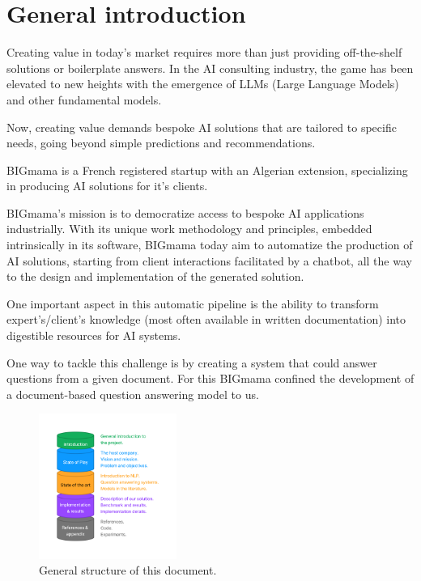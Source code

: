 \documentclass[a4paper,12pt]{article}
\begin{document}
\onecolumn
\tableofcontents
\listoffigures
\listoftables

\newpage
\printglossary[type=\acronymtype, title=List of acronyms]

\newpage

\section{General introduction}
Creating value in today's market requires more than just providing off-the-shelf solutions or boilerplate answers. 
In the AI consulting industry, the game has been elevated to new heights with the emergence of LLMs (Large Language Models) and other fundamental models. 

Now, creating value demands bespoke AI solutions that are tailored to specific needs, 
going beyond simple predictions and recommendations.

BIGmama is a French registered startup with an Algerian extension, 
specializing in producing AI solutions for it's clients.

BIGmama's mission is to democratize access to bespoke AI applications industrially. 
With its unique work methodology and principles, embedded intrinsically in its software, BIGmama today aim
to automatize the production of AI solutions, starting from client interactions facilitated by a chatbot, 
all the way to the design and implementation of the generated solution.

One important aspect in this automatic pipeline is the ability to transform expert's/client's knowledge (most often available in written documentation) 
into digestible resources for AI systems.  

One way to tackle this challenge is by creating a system that could answer questions from a given document. 
For this BIGmama confined the development of a document-based question answering model to us.

\begin{figure}[h]
    \begin{center}
      \includegraphics[width=0.4\textwidth]{figures/plan.png}
    \end{center}
  \caption{General structure of this document.}
    \label{fig:plan}
\end{figure}
\end{document}
